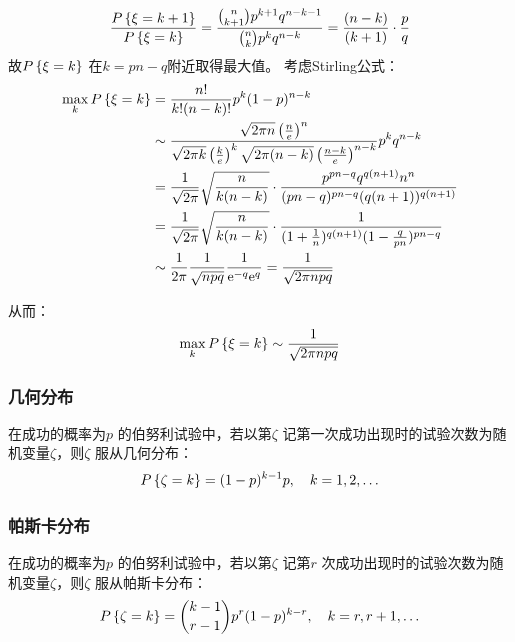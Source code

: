 \[
    \frac{\P{\xi=k+1}}{\P{\xi=k}} = \frac{\binom{n}{k+1} p^{k+1}
    q^{n-k-1}}{\binom{n}{k} p^{k} q^{n-k}} =
    \frac{(n-k)}{(k+1)} \cdot \frac{p}{q}
\]
故\(\P{\xi=k}\) 在\(k=pn-q\)附近取得最大值。
考虑Stirling公式：
\begin{align*}
    \max_{k} \P{\xi=k} &= \frac{n!}{k!(n-k)!} p^{k} (1-p)^{n-k} \\
    &\sim \frac{\sqrt{2\pi n} \left( \frac{n}{e} \right)^{n}}
    {\sqrt{2\pi k} \left( \frac{k}{e} \right)^{k}
    \sqrt{2\pi (n-k)} \left( \frac{n-k}{e} \right)^{n-k}} p^{k}q^{n-k}  \\
    &= \frac{1}{\sqrt{2\pi}} \sqrt{\frac{n}{k(n-k)}} \cdot
    \frac{p^{pn-q} q^{q(n+1)} n^{n} }{(pn-q)^{pn-q}(q(n+1))^{q(n+1)}} \\
    &= \frac{1}{\sqrt{2\pi}} \sqrt{\frac{n}{k(n-k)}} \cdot
    \frac{1}{(1+\frac{1}{n})^{q(n+1)}(1-\frac{q}{pn})^{pn-q}} \\
    &\sim \frac{1}{2\pi} \frac{1}{\sqrt{npq}} \frac{1}{\e^{-q} \e^{q}
    } = \frac{1}{\sqrt{2\pi npq}}
\end{align*}

从而：\[
    \max_{k} \P{\xi=k} \sim \frac{1}{\sqrt{2\pi npq}}
\]

\subsubsection{几何分布}

\begin{definition}[几何分布]
    在成功的概率为\(p\) 的伯努利试验中，若以第\(\zeta\)
    记第一次成功出现时的试验次数为随机变量\(\zeta\)，则\(\zeta\) 服从几何分布：
    \[
        \P{\zeta=k} = (1-p)^{k-1} p, \quad k=1,2,\ldots
    \]
\end{definition}


\subsubsection{帕斯卡分布}

\begin{definition}[帕斯卡分布]
    在成功的概率为\(p\) 的伯努利试验中，若以第\(\zeta\) 记第\(r\)
    次成功出现时的试验次数为随机变量\(\zeta\)，则\(\zeta\) 服从帕斯卡分布：
    \[
        \P{\zeta=k} = \binom{k-1}{r-1} p^r
        (1-p)^{k-r}, \quad k=r,r+1,\ldots
    \]
\end{definition}


